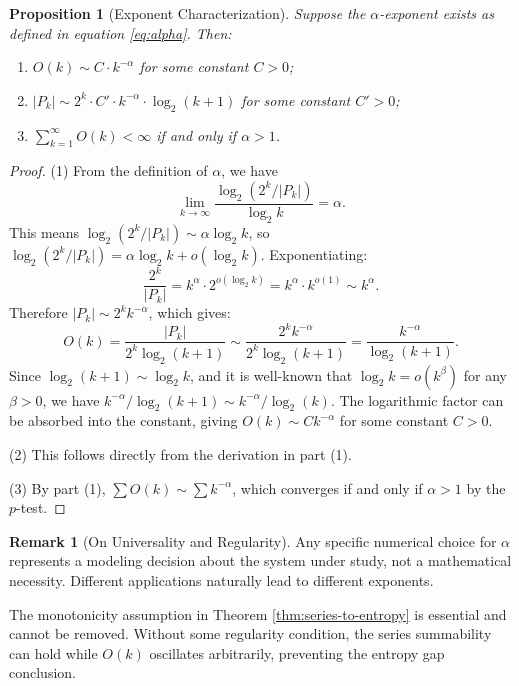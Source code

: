 \documentclass[11pt]{article}
\newtheorem{proposition}[theorem]{Proposition}
\theoremstyle{definition}
\newtheorem{remark}[theorem]{Remark}
\begin{document}
\begin{proposition}[Exponent Characterization]\label{prop:alpha-char}
Suppose the $\alpha$-exponent exists as defined in equation \eqref{eq:alpha}. Then:
\begin{enumerate}
\item $O(k) \sim C \cdot k^{-\alpha}$ for some constant $C > 0$;
\item $|P_k| \sim 2^k \cdot C' \cdot k^{-\alpha} \cdot \log_2(k+1)$ for some constant $C' > 0$;
\item $\sum_{k=1}^\infty O(k) < \infty$ if and only if $\alpha > 1$.
\end{enumerate}
\end{proposition}

\begin{proof}
(1) From the definition of $\alpha$, we have
$$\lim_{k \to \infty} \frac{\log_2(2^k/|P_k|)}{\log_2 k} = \alpha.$$
This means $\log_2(2^k/|P_k|) \sim \alpha \log_2 k$, so $\log_2(2^k/|P_k|) = \alpha \log_2 k + o(\log_2 k)$. Exponentiating:
$$\frac{2^k}{|P_k|} = k^\alpha \cdot 2^{o(\log_2 k)} = k^\alpha \cdot k^{o(1)} \sim k^\alpha.$$
Therefore $|P_k| \sim 2^k k^{-\alpha}$, which gives:
$$O(k) = \frac{|P_k|}{2^k \log_2(k+1)} \sim \frac{2^k k^{-\alpha}}{2^k \log_2(k+1)} = \frac{k^{-\alpha}}{\log_2(k+1)}.$$
Since $\log_2(k+1) \sim \log_2 k$, and it is well-known that $\log_2 k = o(k^\beta)$ for any $\beta > 0$, we have $k^{-\alpha}/\log_2(k+1) \sim k^{-\alpha}/\log_2(k)$. The logarithmic factor can be absorbed into the constant, giving $O(k) \sim C k^{-\alpha}$ for some constant $C > 0$.

(2) This follows directly from the derivation in part (1).

(3) By part (1), $\sum O(k) \sim \sum k^{-\alpha}$, which converges if and only if $\alpha > 1$ by the $p$-test.
\end{proof}

\begin{remark}[On Universality and Regularity]\label{rem:universality}
Any specific numerical choice for $\alpha$ represents a modeling decision about the system under study, not a mathematical necessity. Different applications naturally lead to different exponents.

The monotonicity assumption in Theorem \ref{thm:series-to-entropy} is essential and cannot be removed. Without some regularity condition, the series summability can hold while $O(k)$ oscillates arbitrarily, preventing the entropy gap conclusion.
\end{remark}
\end{document}
